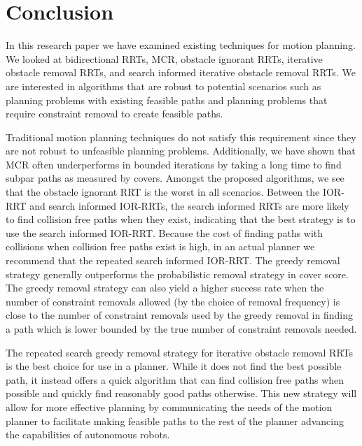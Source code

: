\chapter{Conclusion}
In this research paper we have examined existing techniques for motion planning. We looked at bidirectional RRTs, MCR, obstacle ignorant RRTs, iterative obstacle removal RRTs, and search informed iterative obstacle removal RRTs. We are interested in algorithms that are robust to potential scenarios such as planning problems with existing feasible paths and planning problems that require constraint removal to create feasible paths.

Traditional motion planning techniques do not satisfy this requirement since they are not robust to unfeasible planning problems. Additionally, we have shown that MCR often underperforms in bounded iterations by taking a long time to find subpar paths as measured by covers. Amongst the proposed algorithms, we see that the obstacle ignorant RRT is the worst in all scenarios. Between the IOR-RRT and search informed IOR-RRTs, the search informed RRTs are more likely to find collision free paths when they exist, indicating that the best strategy is to use the search informed IOR-RRT. Because the cost of finding paths with collisions when collision free paths exist is high, in an actual planner we recommend that the repeated search informed IOR-RRT. The greedy removal strategy generally outperforms the probabilistic removal strategy in cover score. The greedy removal strategy can also yield a higher success rate when the number of constraint removals allowed (by the choice of removal frequency) is close to the number of constraint removals used by the greedy removal in finding a path which is lower bounded by the true number of constraint removals needed.

The repeated search greedy removal strategy for iterative obstacle removal RRTs is the best choice for use in a planner. While it does not find the best possible path, it instead offers a quick algorithm that can find collision free paths when possible and quickly find reasonably good paths otherwise. This new strategy will allow for more effective planning by communicating the needs of the motion planner to facilitate making feasible paths to the rest of the planner advancing the capabilities of autonomous robots.